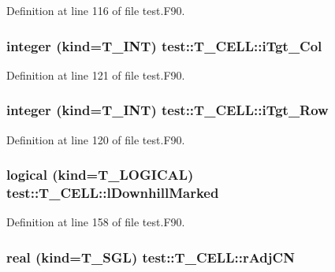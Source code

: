 Definition at line 116 of file test.F90.

\hypertarget{typetest_1_1_t___c_e_l_l_a9a7265d7a24a0a3c536d50a3caf43e1c}{
\subsubsection[{iTgt\_\-Col}]{\setlength{\rightskip}{0pt plus 5cm}integer (kind={\bf T\_\-INT}) {\bf test::T\_\-CELL::iTgt\_\-Col}}}
\label{typetest_1_1_t___c_e_l_l_a9a7265d7a24a0a3c536d50a3caf43e1c}


Definition at line 121 of file test.F90.

\hypertarget{typetest_1_1_t___c_e_l_l_aaa0054fea2f69d0209c244ce4fd5ea92}{
\subsubsection[{iTgt\_\-Row}]{\setlength{\rightskip}{0pt plus 5cm}integer (kind={\bf T\_\-INT}) {\bf test::T\_\-CELL::iTgt\_\-Row}}}
\label{typetest_1_1_t___c_e_l_l_aaa0054fea2f69d0209c244ce4fd5ea92}


Definition at line 120 of file test.F90.

\hypertarget{typetest_1_1_t___c_e_l_l_a591fa5f8996536c08d0f846978ddc8c4}{
\subsubsection[{lDownhillMarked}]{\setlength{\rightskip}{0pt plus 5cm}logical (kind={\bf T\_\-LOGICAL}) {\bf test::T\_\-CELL::lDownhillMarked}}}
\label{typetest_1_1_t___c_e_l_l_a591fa5f8996536c08d0f846978ddc8c4}


Definition at line 158 of file test.F90.

\hypertarget{typetest_1_1_t___c_e_l_l_a56f99983fa3f422b1380670aa276d12a}{
\subsubsection[{rAdjCN}]{\setlength{\rightskip}{0pt plus 5cm}real (kind={\bf T\_\-SGL}) {\bf test::T\_\-CELL::rAdjCN}}}
\label{typetest_1_1_t___c_e_l_l_a56f99983fa3f422b1380670aa276d12a}


